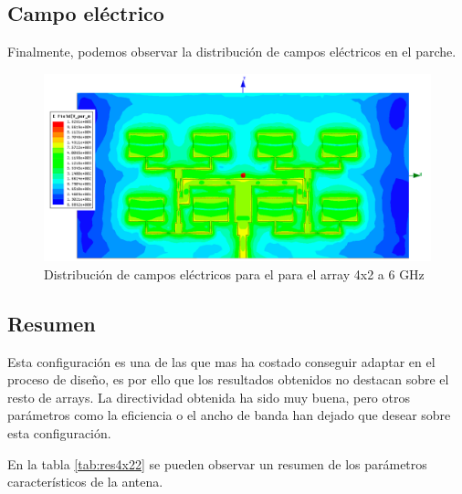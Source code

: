 \subsection{Campo eléctrico}
\par Finalmente, podemos observar la distribución de campos eléctricos en el parche. 

\begin{figure}[H]
    \centering
        \includegraphics[width=\textwidth]{archivos/analisis/4x22/8}
        \caption{Distribución de campos eléctricos para el para el array 4x2 a 6 GHz}
        \label{fig:elec4x22}
\end{figure}

\subsection{Resumen}
\par Esta configuración es una de las que mas ha costado conseguir adaptar en el proceso de diseño, es por ello que los resultados obtenidos no destacan sobre el resto de arrays. La directividad obtenida ha sido muy buena, pero otros parámetros como la eficiencia o el ancho de banda han dejado que desear sobre esta configuración. 
\\
\par En la tabla \ref{tab:res4x22} se pueden observar un resumen de los parámetros característicos de la antena.

